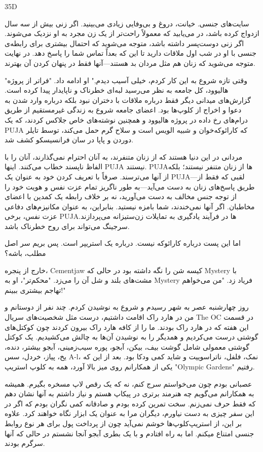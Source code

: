 35D

سایت‌های جنسی. خیانت، دروغ و بی‌وفایی زیادی می‌بینید. اگر زنی بیش از سه سال ازدواج کرده باشد، در می‌یابید که معمولاً راحت‌تر از یک زن مجرد به او نزدیک می‌شوند. اگر زنی دوست‌پسر داشته باشد، متوجه می‌شوید که احتمال بیشتری برای رابطه‌ی جنسی با او در شب اول ملاقات دارید تا این که بعداً تماس شما را پاسخ دهد. در نهایت متوجه می‌شوید که زنان هم مثل مردان بد هستند—آنها فقط در پنهان کردن آن بهترند.

"وقتی تازه شروع به این کار کردم، خیلی آسیب دیدم," او ادامه داد. "فراتر از پروژه هالیوود، کل جامعه به نظر می‌رسید لبه‌ای خطرناک و ناپایدار پیدا کرده است. گزارش‌های میدانی دیگر فقط درباره ملاقات با دختران نبود بلکه درباره وارد شدن به دعوا و اخراج از کلوپ‌ها بود. اعضای جامعه شروع به زندگی غیرمستقیم از طریق درام‌های رخ داده در پروژه هالیوود و همچنین نوشته‌های خاص جلاکس کردند، که یک PUJA که کارائوکه‌خوان و شبیه الویس است و سلاح گرم حمل می‌کند، توسط تایلر دوردن و پاپا در سان فرانسیسکو کشف شد.

مردانی در این دنیا هستند که از زنان متنفرند، به آنان احترام نمی‌گذارند، آنان را با الفاظ ناپسند خطاب می‌کنند. اینها PUJA نیستند. PUJAها از زنان متنفر نیستند؛ بلکه از آنها می‌ترسند. صرفاً با تعریف کردن خود به عنوان یک PUJA—لقبی که فقط از طریق پاسخ‌های زنان به دست می‌آید—به طور ناگریز تمام عزت نفس و هویت خود را از توجه جنس مخالف به دست می‌آورید، نه بر خلاف رابطه یک کمدین با اعضای مخاطبان. اگر آنها نمی‌خندند، شما بامزه نیستید. بنابراین، به عنوان مکانیزم‌های دفاعی عزت نفس، برخی PUJAها در فرآیند یادگیری به تمایلات زن‌ستیزانه می‌پردازند. سرجینگ می‌تواند برای روح خطرناک باشد.

اما این پست درباره کارائوکه نیست. درباره یک استریپر است. پس بریم سر اصل مطلب، باشه؟

خارج از پنجره، Cementjaw کیسه شن را نگه داشته بود در حالی که Mystery با مشت‌های بلند و شل آن را می‌زد. "محکم‌تر"، او به Mystery فریاد زد. "من می‌خواهم تهاجم بیشتری ببینم!"

روز چهارشنبه عصر به شهر رسیدم و شروع به نوشیدن کردم. چند نفر از دوستانم و من در هارد راک اقامت داشتیم، درست مثل شخصیت‌های سریال The OC در قسمت این هفته که در هارد راک بودند. ما را از کافه هارد راک بیرون کردند چون کوکتل‌های گوشتی درست می‌کردیم و همدیگر را به نوشیدن آن‌ها به چالش می‌کشیدیم. یک کوکتل گوشتی معمولی شامل گوشت بیف، بیکن، آبجو، پوره سیب‌زمینی، آبجو بیشتر، دنده، یخ، پیاز، خردل، سس A-l، نمک، فلفل، ناتراسوییت و شاید کمی ودکا بود. بعد از این که یکی از همکارانم روی میز بالا آورد، همه به کلوپ استریپ "Olympic Gardens" رفتیم.

عصبانی بودم چون می‌خواستم سرج کنم، نه که یک رقص لاپ مسخره بگیرم. همیشه به همکارانم می‌گویم چه هنرمند برتری در پیکاپ هستم و نیاز داشتم به آنها نشان دهم که فقط حرف نمی‌زنم. سخت تمرین کرده بودم و صادقانه کمی نگران بودم که اگر در این سفر چیزی به دست نیاورم، دیگران مرا به عنوان یک ابزار نگاه خواهند کرد. علاوه بر این، از استریپ‌کلوپ‌ها خوشم نمی‌آید چون از پرداخت پول برای هر نوع روابط جنسی امتناع میکنم. اما به راه افتادم و با یک بطری آبجو آنجا نشستم در حالی که آنها سرگرم بودند.